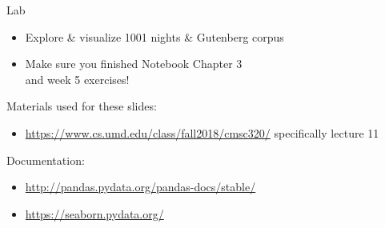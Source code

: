 \documentclass[aspectratio=169,usenames,dvipsnames]{beamer}
\begin{document}

\begin{frame}{Lab}
\begin{itemize}
    \item Explore \& visualize 1001 nights \& Gutenberg corpus
    \item Make sure you finished Notebook Chapter 3 \\
        and week 5 exercises!
\end{itemize}
\end{frame}

\begin{frame}
Materials used for these slides:
\begin{itemize}
\item \url{https://www.cs.umd.edu/class/fall2018/cmsc320/}
    specifically lecture 11
\end{itemize}

\vspace{1em}
Documentation:
\begin{itemize}
    \item \url{http://pandas.pydata.org/pandas-docs/stable/}
    \item \url{https://seaborn.pydata.org/}
\end{itemize}
\end{frame}
\end{document}
